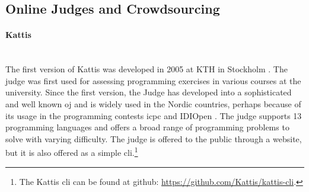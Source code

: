 \subsection{Online Judges and Crowdsourcing}
\label{subsec:oj&c}

\paragraph*{Kattis} \hfill \\
The first version of Kattis was developed in 2005 at KTH in Stockholm \cite{a:Enstrom2011}. The judge was first used for assessing programming exercises in various courses at the university. Since the first version, the Judge has developed into a sophisticated and well known \gls{oj} and is widely used in the Nordic countries, perhaps because of its usage in the programming contests \gls{icpc} \cite{ICPC} and IDIOpen \cite{IDIOPEN}. The judge supports 13 programming languages and offers a broad range of programming problems to solve with varying difficulty. The judge is offered to the public through a website, but it is also offered as a simple \gls{cli}.\footnote{The Kattis \gls{cli} can be found at github: \url{https://github.com/Kattis/kattis-cli}.} \\

